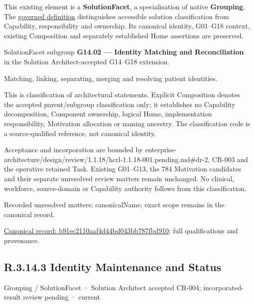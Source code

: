 This existing element is a \textbf{SolutionFacet}, a specialisation of native
\textbf{Grouping}. The \href{\detokenize{../../../../../../../governance/continuum-representation.md#solutionfacet-classification--1119-candidate}}{governed definition}
distinguishes accessible solution classification from Capability, responsibility
and ownership. Its canonical identity, G01–G18 context, existing Composition
and separately established Home assertions are preserved.



SolutionFacet subgroup \textbf{G14.02 — Identity Matching and Reconciliation} in the Solution Architect-accepted G14–G18 extension.



Matching, linking, separating, merging and resolving patient identities.



This is classification of architectural statements. Explicit Composition denotes the accepted parent/subgroup classification only; it establishes no Capability decomposition, Component ownership, logical Home, implementation responsibility, Motivation allocation or naming ancestry. The classification code is a source-qualified reference, not canonical identity.



Acceptance and incorporation are bounded by enterprise-architecture/design/review/1.1.18/hcrl-1.1.18-001.pending.md\#dr-2, CR-003 and the operative retained Task. Existing G01–G13, the 784 Motivation candidates and their separate unresolved review matters remain unchanged. No clinical, workforce, source-domain or Capability authority follows from this classification.


{\small Recorded unresolved matters: canonicalName; exact scope remains in the canonical record.}\par
{\footnotesize \href{../../../../../../../continuum/grouping/b91ec2110aaf4d44bd043bb787fbd910.md}{Canonical record: b91ec2110aaf4d44bd043bb787fbd910}; full qualifications and provenance.}\par
\subsection*{R.3.14.3 Identity Maintenance and Status}
\label{navigation:R.3.14.3}

\label{element:801386f27cda458b8ce811f133d917e9}
{\small Grouping / SolutionFacet · Solution Architect accepted CR-004; incorporated-result review pending · current}\par

